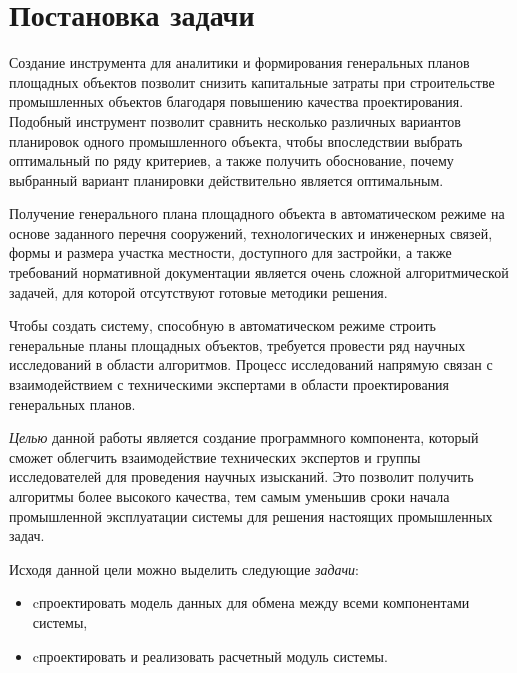 \section*{\Large{Постановка задачи}}

Создание инструмента для аналитики и формирования генеральных планов площадных объектов позволит снизить
капитальные затраты при строительстве промышленных объектов благодаря повышению качества проектирования.
Подобный инструмент позволит сравнить несколько различных вариантов планировок одного промышленного объекта,
чтобы впоследствии выбрать оптимальный по ряду критериев, а также получить обоснование,
почему выбранный вариант планировки действительно является оптимальным.

Получение генерального плана площадного объекта в автоматическом режиме на основе
заданного перечня сооружений, технологических и инженерных связей,
формы и размера участка местности, доступного для застройки, а также требований нормативной документации является очень
сложной алгоритмической задачей, для которой отсутствуют готовые методики решения.

Чтобы создать систему, способную в автоматическом режиме строить генеральные планы площадных объектов,
требуется провести ряд научных исследований в области алгоритмов.
Процесс исследований напрямую связан с взаимодействием с техническими экспертами
в области проектирования генеральных планов.

\textit{Целью} данной работы является создание программного компонента,
который сможет облегчить взаимодействие технических экспертов
и группы исследователей для проведения научных изысканий.
Это позволит получить алгоритмы более высокого качества,
тем самым уменьшив сроки начала промышленной эксплуатации системы
для решения настоящих промышленных задач.

Исходя данной цели можно выделить следующие \textit{задачи}:
\begin{itemize}
    \item cпроектировать модель данных для обмена между всеми компонентами системы,
    \item cпроектировать и реализовать расчетный модуль системы.
\end{itemize}
